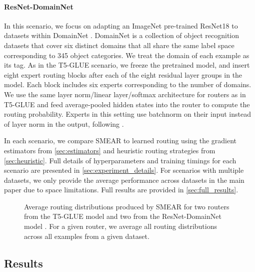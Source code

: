 \documentclass{article}
\theoremstyle{plain}
\theoremstyle{definition}
\theoremstyle{remark}
\begin{document}
\paragraph{ResNet-DomainNet}

In this scenario, we focus on adapting an ImageNet pre-trained ResNet18 \citep{he2016deep} to datasets within DomainNet \citep{peng2019moment}.
DomainNet is a collection of object recognition datasets that cover six distinct domains that all share the same label space corresponding to 345 object categories.
We treat the domain of each example as its tag.
As in the T5-GLUE scenario, we freeze the pretrained model, and insert eight expert routing blocks after each of the eight residual layer groups in the model.
Each block includes six experts corresponding to the number of domains.
We use the same layer norm/linear layer/softmax architecture for routers as in T5-GLUE and feed average-pooled hidden states into the router to compute the routing probability.
Experts in this setting use batchnorm on their input instead of layer norm in the output, following \citep{rebuffi2017learning}. 

In each scenario, we compare SMEAR to learned routing using the gradient estimators from \cref{sec:estimators} and heuristic routing strategies from \cref{sec:heuristic}.
Full details of hyperparameters and training timings for each scenario are presented in \cref{sec:experiment_details}.
For scenarios with multiple datasets, we only provide the average performance across datasets in the main paper due to space limitations.
Full results are provided in \cref{sec:full_results}.

\begin{figure*}[htp]
\centering
{}
\caption{Average routing distributions produced by SMEAR for two routers from the T5-GLUE model  and two from the ResNet-DomainNet model . For a given router, we average all routing distributions across all examples from a given dataset.}
\label{fig:sample_routing_distributions}
\end{figure*}

\subsection{Results}
\end{document}
